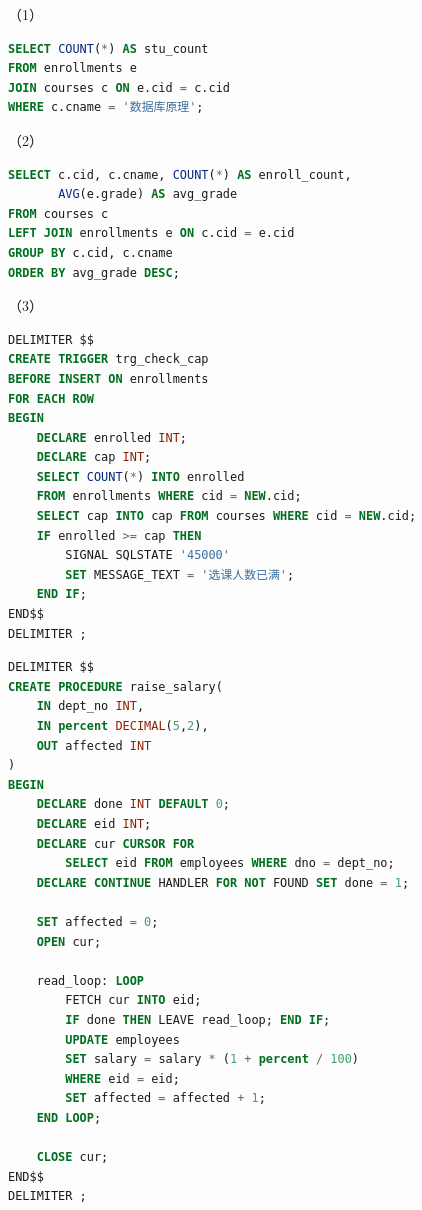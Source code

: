 \documentclass[a4paper,11pt]{article}
\begin{document}
\q
\par （1）
\begin{lstlisting}[language=SQL]
SELECT COUNT(*) AS stu_count
FROM enrollments e
JOIN courses c ON e.cid = c.cid
WHERE c.cname = '数据库原理';
\end{lstlisting}
\par （2）
\begin{lstlisting}[language=SQL]
SELECT c.cid, c.cname, COUNT(*) AS enroll_count,
       AVG(e.grade) AS avg_grade
FROM courses c
LEFT JOIN enrollments e ON c.cid = e.cid
GROUP BY c.cid, c.cname
ORDER BY avg_grade DESC;
\end{lstlisting}

\par （3）
\begin{lstlisting}[language=SQL]
DELIMITER $$
CREATE TRIGGER trg_check_cap
BEFORE INSERT ON enrollments
FOR EACH ROW
BEGIN
    DECLARE enrolled INT;
    DECLARE cap INT;
    SELECT COUNT(*) INTO enrolled
    FROM enrollments WHERE cid = NEW.cid;
    SELECT cap INTO cap FROM courses WHERE cid = NEW.cid;
    IF enrolled >= cap THEN
        SIGNAL SQLSTATE '45000'
        SET MESSAGE_TEXT = '选课人数已满';
    END IF;
END$$
DELIMITER ;
\end{lstlisting}

\q
\begin{lstlisting}[language=SQL]
DELIMITER $$
CREATE PROCEDURE raise_salary(
    IN dept_no INT,
    IN percent DECIMAL(5,2),
    OUT affected INT
)
BEGIN
    DECLARE done INT DEFAULT 0;
    DECLARE eid INT;
    DECLARE cur CURSOR FOR
        SELECT eid FROM employees WHERE dno = dept_no;
    DECLARE CONTINUE HANDLER FOR NOT FOUND SET done = 1;

    SET affected = 0;
    OPEN cur;

    read_loop: LOOP
        FETCH cur INTO eid;
        IF done THEN LEAVE read_loop; END IF;
        UPDATE employees
        SET salary = salary * (1 + percent / 100)
        WHERE eid = eid;
        SET affected = affected + 1;
    END LOOP;

    CLOSE cur;
END$$
DELIMITER ;
\end{lstlisting}
\end{document}
